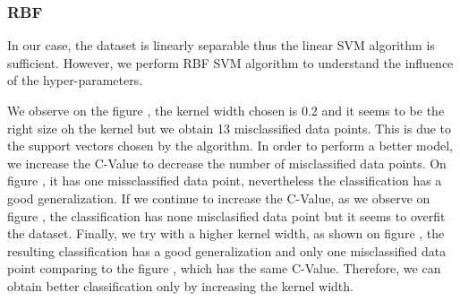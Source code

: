 \subsubsection{RBF}

In our case, the dataset is linearly separable thus the linear SVM algorithm is sufficient. However, we perform RBF SVM algorithm to understand the influence of the hyper-parameters.

We observe on the figure %
, the kernel width chosen is 0.2 and it seems to be the right size oh the kernel but we obtain 13 misclassified data points. This is due to the support vectors chosen by the algorithm. In order to perform a better model, we increase the C-Value to decrease the number of misclassified data points. On figure
, it has one missclassified data point, nevertheless the classification has a good generalization. If we continue to increase the C-Value, as we observe on figure
, the classification has none misclasified data point but it seems to overfit the dataset.
Finally, we try with a higher kernel width, as shown on figure
, the resulting classification has a good generalization and only one misclassified data point comparing to the figure 
, which has the same C-Value. Therefore, we can obtain better classification only by increasing the kernel width. 




